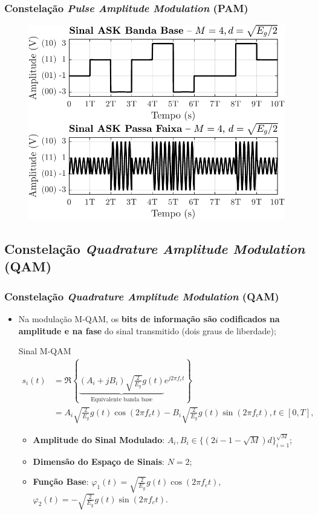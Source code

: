 \documentclass{beamer}
\newcommand{\pag}[1] {\begin{frame}#1\end{frame}}
\begin{document}
\pag{
	\frametitle{Constelação \textit{Pulse Amplitude Modulation} (PAM)}
	\begin{figure}[!htb]
		\centering
		\includegraphics[width=0.9\linewidth]{SinalASK.pdf}
	\end{figure}	
}

\subsection{Constelação \textit{Quadrature Amplitude Modulation} (QAM)}

\pag{
	\frametitle{Constelação \textit{Quadrature Amplitude Modulation} (QAM)}
	\begin{itemize}
		\item Na modulação M-QAM, os \textbf{bits de informação são codificados na amplitude e na fase} do sinal transmitido (dois graus de liberdade);
		\begin{block}{Sinal M-QAM}
			\vspace{-0.5cm}
			\begin{equation}
				\begin{aligned}
				s_{i}(t) &= \Re\left\{\underbrace{(A_{i} + jB_{i})\sqrt{\frac{2}{E_{g}}}g(t)}_{\text{Equivalente banda base}}e^{j2\pi f_{c}t}\right\} \\
				&= A_{i}\sqrt{\frac{2}{E_{g}}}g(t)\cos( 2\pi f_{c} t ) - B_{i}\sqrt{\frac{2}{E_{g}}}g(t)\sin( 2\pi f_{c} t ), t \in [0,T],
				\end{aligned}
			\end{equation}
			\vspace{-0.5cm}
				\begin{itemize}
					\item \textbf{Amplitude do Sinal Modulado}: $A_{i}, B_{i} \in \{( 2i - 1 - \sqrt{M})d\}_{i = 1}^{\sqrt{M}}$;
					\item \textbf{Dimensão do Espaço de Sinais}: $N = 2$;
					\item \textbf{Função Base}: $\varphi_{1}(t) = \sqrt{\frac{2}{E_{g}}}g(t)\cos( 2\pi f_{c} t )$, $\varphi_{2}(t) = -\sqrt{\frac{2}{E_{g}}}g(t)\sin( 2\pi f_{c} t )$.
				\end{itemize}
		\end{block}
	\end{itemize}
}
\end{document}
